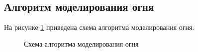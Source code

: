 \documentclass[a4paper,14pt]{report}
\begin{document}
\subsection{Алгоритм моделирования огня}
На рисунке \ref{fig:sh3} приведена схема алгоритма моделирования огня.
\begin{figure}[H]
 \caption{Схема алгоритма моделирования огня}
 \label{fig:sh3}
\end{figure}
\end{document}
